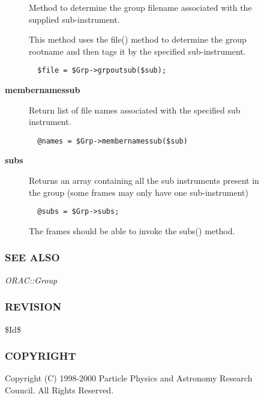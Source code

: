\begin{description}
\begin{description}
\begin{description}
Method to determine the group filename associated with
the supplied sub-instrument.



This method uses the file() method to determine the
group rootname and then tags it by the specified sub-instrument.

\begin{verbatim}
  $file = $Grp->grpoutsub($sub);
\end{verbatim}

\item[{\textbf{membernamessub}}] \mbox{}

Return list of file names associated with the specified
sub instrument.

\begin{verbatim}
  @names = $Grp->membernamessub($sub)
\end{verbatim}

\item[{\textbf{subs}}] \mbox{}

Returns an array containing all the sub instruments present
in the group (some frames may only have one sub-instrument)

\begin{verbatim}
  @subs = $Grp->subs;
\end{verbatim}


The frames should be able to invoke the subs() method.

\end{description}
\subsubsection*{SEE ALSO\label{ORAC::Group::SCUBA_SEE_ALSO}}


\emph{ORAC::Group}

\subsubsection*{REVISION\label{ORAC::Group::SCUBA_REVISION}}


\$Id\$

\subsubsection*{COPYRIGHT\label{ORAC::Group::SCUBA_COPYRIGHT}}


Copyright (C) 1998-2000 Particle Physics and Astronomy Research
Council. All Rights Reserved.


\end{description}
\end{description}
